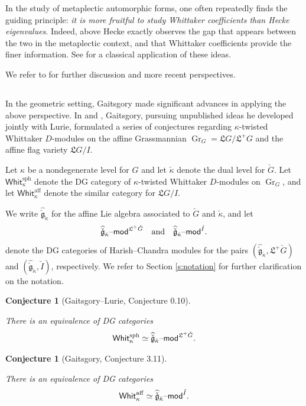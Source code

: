 \documentclass[11pt,reqno]{amsart}
\newcommand{\cgk}{\widehat{\check{\mathfrak{g}}}_{\check{\kappa}}}
\newcommand{\aff}{\operatorname{aff}}
\newcommand{\fL}{\mathfrak{L}}
\newcommand{\Gr}{\operatorname{Gr}}
\newcommand{\on}{\operatorname}
\newtheorem{conj}[subsubsection]{Conjecture}
\theoremstyle{remark}
\numberwithin{equation}{section}
\newcommand{\ck}{\check{\kappa}}
\newcommand{\cg}{\check{G}}
\newcommand{\cG}{\check{G}}
\renewcommand{\mod}{\text{\textendash}\mathsf{mod}}
\newcommand{\Whit}{\mathsf{Whit}}
\begin{document}
In the study of metaplectic automorphic forms, one often 
repeatedly finds the guiding principle: 
\emph{it is more fruitful to study Whittaker coefficients than
Hecke eigenvalues}. Indeed, above Hecke exactly observes
the gap that appears between the two in the metaplectic context,
and that Whittaker coefficients provide the finer 
information. See \cite{gps} for a classical application
of these ideas.

We refer to \cite{ggw} for further discussion 
and more recent perspectives. 

\subsection{}

In the geometric setting, Gaitsgory 
made significant advances in applying
the above perspective.  
In \cite{gtw} and \cite{quantum-langlands-summary},
Gaitsgory, pursuing unpublished ideas he developed jointly with
Lurie, formulated a series of conjectures regarding
$\kappa$-twisted Whittaker $D$-modules on the 
affine Grassmannian $\Gr_G = \fL G/\fL^+ G$ and the affine flag 
variety $\fL G/I$.

 Let $\kappa$ be a {nondegenerate} level for $G$ 
 and let 
 $\check{\kappa}$
denote the dual level for $\check{G}$.
Let $\Whit_{\kappa}^{\on{sph}}$ denote the DG category of 
$\kappa$-twisted Whittaker $D$-modules on $\Gr_G$,
and let $\Whit_{\kappa}^{\aff}$ denote the similar
category for $\fL G/I$. 

{ We write $\cgk$ for the affine Lie algebra associated to $\cg$ and 
$\ck$, and  
let
%
\[ \cgk\mod^{\fL^+ \check{G}} \quad \text{and} \quad 
\cgk\mod^{\check{I}}.
\]
%
denote the DG categories of Harish--Chandra modules 
for the pairs $(\cgk, \fL^+ \check{G})$ and $(\cgk, \check{I})$, respectively. 
We refer to Section \ref{s:notation} for further clarification
on the notation.}
\begin{conj}[Gaitsgory--Lurie, 
\cite{gtw} Conjecture 0.10]\label{conj:fle-sph}

There is an equivalence of DG categories
\begin{equation} \label{e:gl} 
\Whit_{\kappa}^{\on{sph}}
\simeq 
\cgk\mod^{\fL^+ \cG}.
\end{equation}

\end{conj}

\begin{conj}[Gaitsgory, \cite{quantum-langlands-summary} Conjecture 3.11]\label{conj:fle-tame}

There is an equivalence of DG categories
\begin{equation} \label{e:tfle}
\Whit_{\kappa}^{\aff} 
\simeq 
\cgk\mod^{\check{I}}.
\end{equation}

\end{conj}
\end{document}
